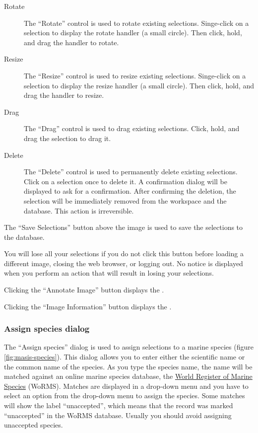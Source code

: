\documentclass[twoside,a4paper]{refart}
\begin{document}
\begin{description}
\item[Rotate]
    The ``Rotate'' control is used to rotate existing selections. Singe-click on a selection to display the rotate handler (a small circle). Then click, hold, and drag the handler to rotate.

\item[Resize]
    The ``Resize'' control is used to resize existing selections. Singe-click on a selection to display the resize handler (a small circle). Then click, hold, and drag the handler to resize.

\item[Drag]
    The ``Drag'' control is used to drag existing selections. Click, hold, and drag the selection to drag it.

\item[Delete]
    The ``Delete'' control is used to permanently delete existing selections. Click on a selection once to delete it. A confirmation dialog will be displayed to ask for a confirmation. After confirming the deletion, the selection will be immediately removed from the workspace and the database. This action is irreversible.
\end{description}

The ``Save Selections'' button above the image is used to save the selections to the database.

\attention
You will lose all your selections if you do not click this button before loading a different image, closing the web browser, or logging out. No notice is displayed when you perform an action that will result in losing your selections.

Clicking the ``Annotate Image'' button displays the .

Clicking the ``Image Information'' button displays the .

\subsubsection{Assign species dialog}
\label{Assign species dialog}

The ``Assign species'' dialog is used to assign selections to a marine species (figure \ref{fig:masis-species}). This dialog allows you to enter either the scientific name or the common name of the species. As you type the species name, the name will be matched against an online marine species database, the \href{http://www.marinespecies.org/}{World Register of Marine Species} (WoRMS). Matches are displayed in a drop-down menu and you have to select an option from the drop-down menu to assign the species. Some matches will show the label ``unaccepted'', which means that the record was marked ``unaccepted'' in the WoRMS database. Usually you should avoid assigning unaccepted species.
\end{document}
